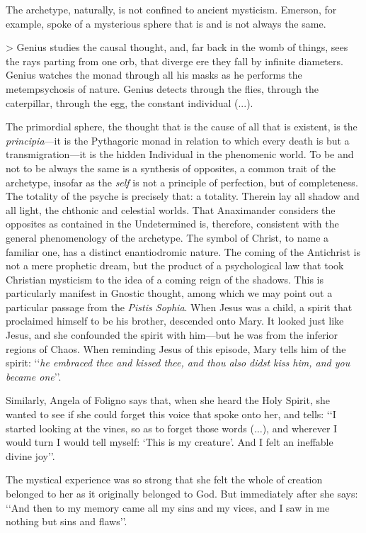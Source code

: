 \documentclass[a4paper]{article}
\begin{document}
The archetype, naturally, is not confined to ancient mysticism. Emerson, for
example, spoke of a mysterious sphere that is and is not always the same.

> Genius studies the causal thought, and, far back in the womb of things, sees
the rays parting from one orb, that diverge ere they fall by infinite diameters.
Genius watches the monad through all his masks as he performs the metempsychosis
of nature. Genius detects through the flies, through the caterpillar, through
the egg, the constant individual (...).

The primordial sphere, the thought that is the cause of all that is existent, is
the \textit{principia}---it is the Pythagoric monad in relation to which every
death is but a transmigration---it is the hidden Individual in the phenomenic
world. To be and not to be always the same is a synthesis of opposites, a common
trait of the archetype, insofar as the \textit{self} is not a principle of
perfection, but of completeness. The totality of the psyche is precisely that: a
totality. Therein lay all shadow and all light, the chthonic and celestial
worlds.  That Anaximander considers the opposites as contained in the
Undetermined is, therefore, consistent with the general phenomenology of the
archetype. The symbol of Christ, to name a familiar one, has a distinct
enantiodromic nature. The coming of the Antichrist is not a mere prophetic
dream, but the product of a psychological law that took Christian mysticism to
the idea of a coming reign of the shadows. This is particularly manifest in Gnostic
thought, among which we may point out a particular passage from the \textit{Pistis
Sophia}. When Jesus was a child, a spirit that proclaimed himself to be his
brother, descended onto Mary. It looked just like Jesus, and she confounded the
spirit with him---but he was from the inferior regions of Chaos. When
reminding Jesus of this episode, Mary tells him of the spirit: \lq\lq \textit{he
embraced thee and kissed thee, and thou also didst kiss him, and you became
one}\rq\rq{}.

Similarly, Angela of Foligno says that, when she heard the Holy Spirit, she
wanted to see if she could forget this voice that spoke onto her, and tells:
\lq\lq I started looking at the vines, so as to forget those words ($\ldots$),
and wherever I would turn I would tell myself: \lq This is my creature\rq{}. And
I felt an ineffable divine joy\rq\rq{}.

The mystical experience was so strong that she felt the whole of creation
belonged to her as it originally belonged to God. But immediately after she
says: \lq\lq And then to my memory came all my sins and my vices, and I saw in
me nothing but sins and flaws\rq\rq{}. 
\end{document}
